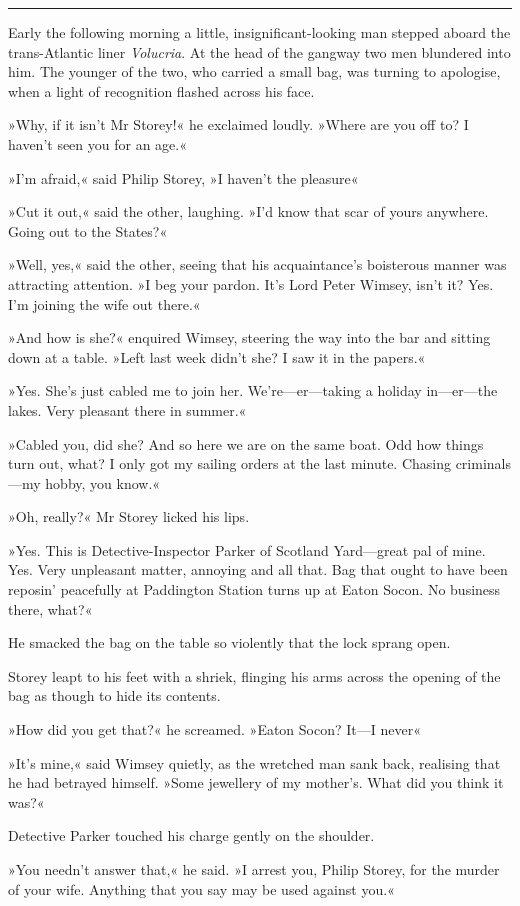\noindent\hfil\rule{0.5\textwidth}{.4pt}\hfil 

Early the following morning a little, insignificant-looking man stepped aboard the trans-Atlantic liner \textit{Volucria}. At the head of the gangway two men blundered into him. The younger of the two, who carried a small bag, was turning to apologise, when a light of recognition flashed across his face.

»Why, if it isn't Mr Storey!« he exclaimed loudly. »Where are you off to? I haven't seen you for an age.«

»I'm afraid,« said Philip Storey, »I haven't the pleasure\longdash«

»Cut it out,« said the other, laughing. »I'd know that scar of yours anywhere. Going out to the States?«

»Well, yes,« said the other, seeing that his acquaintance's boisterous manner was attracting attention. »I beg your pardon. It's Lord Peter Wimsey, isn't it? Yes. I'm joining the wife out there.«

»And how is she?« enquired Wimsey, steering the way into the bar and sitting down at a table. »Left last week didn't she? I saw it in the papers.«

»Yes. She's just cabled me to join her. We're—er—taking a holiday in—er—the lakes. Very pleasant there in summer.«

»Cabled you, did she? And so here we are on the same boat. Odd how things turn out, what? I only got my sailing orders at the last minute. Chasing criminals—my hobby, you know.«

»Oh, really?« Mr Storey licked his lips.

»Yes. This is Detective-Inspector Parker of Scotland Yard—great pal of mine. Yes. Very unpleasant matter, annoying and all that. Bag that ought to have been reposin' peacefully at Paddington Station turns up at Eaton Socon. No business there, what?«

He smacked the bag on the table so violently that the lock sprang open.

Storey leapt to his feet with a shriek, flinging his arms across the opening of the bag as though to hide its contents.

»How did you get that?« he screamed. »Eaton Socon? It—I never\longdash«

»It's mine,« said Wimsey quietly, as the wretched man sank back, realising that he had betrayed himself. »Some jewellery of my mother's. What did you think it was?«

Detective Parker touched his charge gently on the shoulder.

»You needn't answer that,« he said. »I arrest you, Philip Storey, for the murder of your wife. Anything that you say may be used against you.«